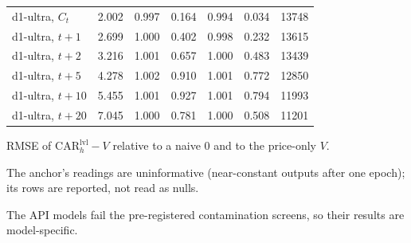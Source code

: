 \begin{table}[htbp]
\begin{threeparttable}
\begin{tabular}{@{}lS[table-format=1.3]S[table-format=1.3]S[table-format=1.3]S[table-format=1.3]S[table-format=1.3]S[table-format=5.0]@{}}
d1-ultra, $C_t$ & 2.002 & 0.997 & 0.164 & 0.994 & 0.034 & 13748 \\
d1-ultra, $t{+}1$ & 2.699 & 1.000 & 0.402 & 0.998 & 0.232 & 13615 \\
d1-ultra, $t{+}2$ & 3.216 & 1.001 & 0.657 & 1.000 & 0.483 & 13439 \\
d1-ultra, $t{+}5$ & 4.278 & 1.002 & 0.910 & 1.001 & 0.772 & 12850 \\
d1-ultra, $t{+}10$ & 5.455 & 1.001 & 0.927 & 1.001 & 0.794 & 11993 \\
d1-ultra, $t{+}20$ & 7.045 & 1.000 & 0.781 & 1.000 & 0.508 & 11201 \\
\bottomrule
\end{tabular}
\begin{tablenotes}[flushleft]\footnotesize
\item RMSE of $\mathrm{CAR}^{\mathrm{lvl}}_h - V$ relative to a naive 0 and to the price-only $V$.
\item The anchor's readings are uninformative (near-constant outputs after one epoch); its rows are reported, not read as nulls.
\item The API models fail the pre-registered contamination screens, so their results are model-specific.
\end{tablenotes}
\end{threeparttable}
\end{table}

